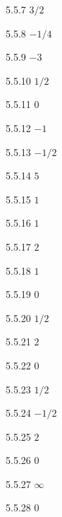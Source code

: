 \begin{Answer}{5.5.7}
 $3/2$
\end{Answer}
\begin{Answer}{5.5.8}
 $-1/4$
\end{Answer}
\begin{Answer}{5.5.9}
 $-3$
\end{Answer}
\begin{Answer}{5.5.10}
 $1/2$
\end{Answer}
\begin{Answer}{5.5.11}
 $0$
\end{Answer}
\begin{Answer}{5.5.12}
 $-1$
\end{Answer}
\begin{Answer}{5.5.13}
 $-1/2$
\end{Answer}
\begin{Answer}{5.5.14}
 $5$
\end{Answer}
\begin{Answer}{5.5.15}
 $1$
\end{Answer}
\begin{Answer}{5.5.16}
 $1$
\end{Answer}
\begin{Answer}{5.5.17}
 $2$
\end{Answer}
\begin{Answer}{5.5.18}
 $1$
\end{Answer}
\begin{Answer}{5.5.19}
 $0$
\end{Answer}
\begin{Answer}{5.5.20}
 $1/2$
\end{Answer}
\begin{Answer}{5.5.21}
 $2$
\end{Answer}
\begin{Answer}{5.5.22}
 $0$
\end{Answer}
\begin{Answer}{5.5.23}
 $1/2$
\end{Answer}
\begin{Answer}{5.5.24}
 $-1/2$
\end{Answer}
\begin{Answer}{5.5.25}
 $2$
\end{Answer}
\begin{Answer}{5.5.26}
 $0$
\end{Answer}
\begin{Answer}{5.5.27}
 $\infty$
\end{Answer}
\begin{Answer}{5.5.28}
 $0$
\end{Answer}
